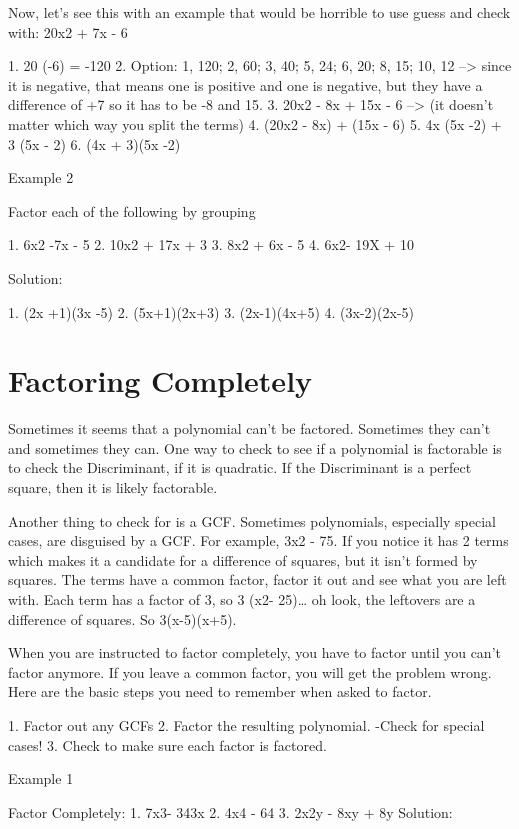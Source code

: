 Now, let's see this with an example that would be horrible to use guess and check with: 20x2 + 7x - 6

1. 20 (-6) = -120
2. Option: 1, 120; 2, 60; 3, 40; 5, 24; 	6, 20; 	8, 15; 10, 12 --> since it is negative, that means one is positive and one is negative, but they have a difference of +7 so it has to be -8 and 15. 
3. 20x2 - 8x + 15x - 6 --> (it doesn't matter which way you split the terms)
4. (20x2 - 8x) + (15x - 6) 
5. 4x (5x -2) + 3 (5x - 2) 
6. (4x + 3)(5x -2)

Example 2

Factor each of the following by grouping

1. 6x2 -7x - 5
2. 10x2 + 17x + 3
3. 8x2 + 6x - 5
4. 6x2- 19X + 10

Solution:

1. (2x +1)(3x -5)
2. (5x+1)(2x+3)
3. (2x-1)(4x+5)
4. (3x-2)(2x-5)


\section{Factoring Completely}

Sometimes it seems that a polynomial can't be factored. Sometimes they can't and sometimes they can. One way to check to see if a polynomial is factorable is to check the Discriminant, if it is quadratic. If the Discriminant is a perfect square, then it is likely factorable. 

Another thing to check for is a GCF. Sometimes polynomials, especially special cases, are disguised by a GCF. For example, 3x2 - 75. If you notice it has 2 terms which makes it a candidate for a difference of squares, but it isn't formed by squares. The terms have a common factor, factor it out and see what you are left with. Each term has a factor of 3, so 3 (x2- 25)\ldots{} oh look, the leftovers are a difference of squares. So 3(x-5)(x+5).

When you are instructed to factor completely, you have to factor until you can't factor anymore. If you leave a common factor, you will get the problem wrong. Here are the basic steps you need to remember when asked to factor.

1. Factor out any GCFs
2. Factor the resulting polynomial.
 -Check for special cases!
 3. Check to make sure each factor is factored.


Example 1

Factor Completely: 
1. 7x3- 343x 
2. 4x4 - 64
3. 2x2y - 8xy + 8y
Solution:

